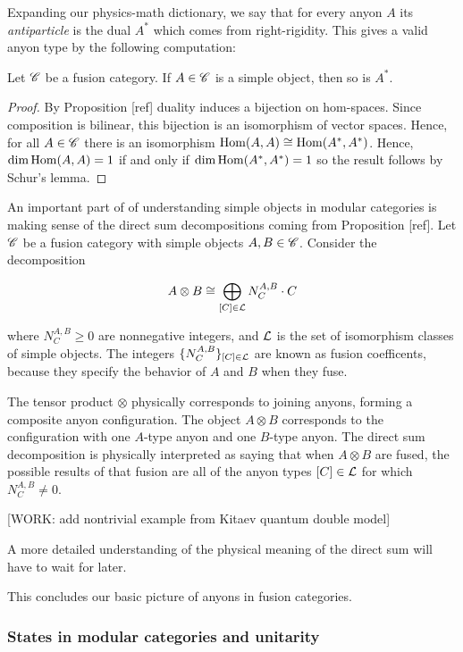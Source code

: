 Expanding our physics-math dictionary, we say that for every anyon $A$ its \textit{antiparticle} is the dual $A^*$ which comes from right-rigidity. This gives a valid anyon type by the following computation:

\begin{proposition} Let $\mathscr{C}$ be a fusion category. If $A\in \mathscr{C}$ is a simple object, then so is $A^*$.
\end{proposition}
\begin{proof} By Proposition [ref] duality induces a bijection on hom-spaces. Since composition is bilinear, this bijection is an isomorphism of vector spaces. Hence, for all $A\in \mathscr{C}$ there is an isomorphism $\operatorname{Hom}(A,A)\cong \operatorname{Hom}(A^*,A^*)$.  Hence, $\dim \operatorname{Hom}(A,A)= 1$ if and only if $\dim \operatorname{Hom}(A^*,A^*)=1$ so the result follows by Schur's lemma.
\end{proof}

An important part of of understanding simple objects in modular categories is making sense of the direct sum decompositions coming from Proposition [ref]. Let $\mathscr{C}$ be a fusion category with simple objects $A,B\in \mathscr{C}$. Consider the decomposition

$$A\otimes B \cong \bigoplus_{[C]\in \mathcal{L}}N^{A,B}_{C}\cdot C$$

where $N^{A,B}_{C}\geq 0$ are nonnegative integers, and $\mathcal{L}$ is the set of isomorphism classes of simple objects. The integers $\{N^{A,B}_C\}_{[C]\in \mathcal{L}}$ are known as fusion coefficents, because they specify the behavior of $A$ and $B$ when they fuse.

The tensor product $\otimes$ physically corresponds to joining anyons, forming a composite anyon configuration. The object $A\otimes B$ corresponds to the configuration with one $A$-type anyon and one $B$-type anyon. The direct sum decomposition is physically interpreted as saying that when $A\otimes B$ are fused, the possible results of that fusion are all of the anyon types $[C]\in \mathcal{L}$ for which $N^{A,B}_{C}\neq 0$.

[WORK: add nontrivial example from Kitaev quantum double model]

A more detailed understanding of the physical meaning of the direct sum will have to wait for later.

This concludes our basic picture of anyons in fusion categories.

\subsubsection{States in modular categories and unitarity}

